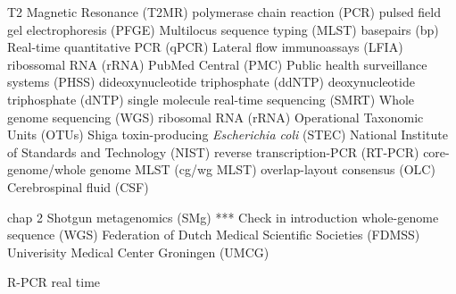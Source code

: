 
\begin{acronym}[MPC] %

\end{acronym}

T2 Magnetic Resonance (T2MR)
polymerase chain reaction (PCR)
pulsed field gel electrophoresis (PFGE)
Multilocus sequence typing (MLST)
basepairs (bp)
Real-time quantitative PCR (qPCR)
Lateral flow immunoassays (LFIA)
ribossomal RNA (rRNA)
PubMed Central\textsuperscript{\small\textregistered} (PMC)
Public health surveillance systems (PHSS)
dideoxynucleotide triphosphate (ddNTP) 
deoxynucleotide triphosphate (dNTP)
single molecule real-time sequencing (SMRT)
Whole genome sequencing (WGS)
ribosomal RNA (rRNA)
Operational Taxonomic Units (OTUs)
Shiga toxin-producing \textit{Escherichia coli} (STEC)
National Institute of Standards and Technology (NIST)
reverse transcription-PCR (RT-PCR)
core-genome/whole genome MLST (cg/wg MLST)
overlap-layout consensus (OLC)
Cerebrospinal fluid (CSF)

chap 2 
Shotgun metagenomics (SMg) *** Check in introduction
whole-genome sequence (WGS)
Federation of Dutch Medical Scientific Societies (FDMSS)
Univerisity Medical Center Groningen (UMCG)

R-PCR real time 